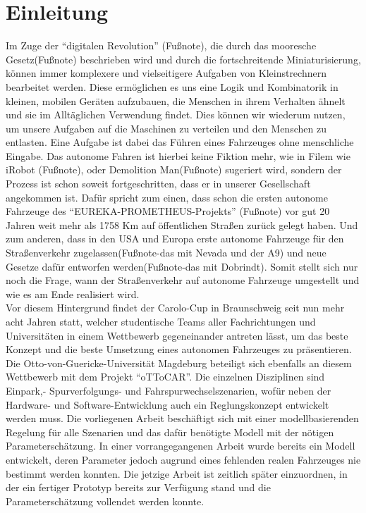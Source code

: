 \section{Einleitung}
Im Zuge der "`digitalen Revolution"' (Fußnote), die durch das mooresche Gesetz(Fußnote) beschrieben wird und durch die fortschreitende Miniaturisierung, können immer komplexere und vielseitigere Aufgaben von Kleinstrechnern bearbeitet werden. Diese ermöglichen es uns eine Logik und Kombinatorik in kleinen, mobilen Geräten aufzubauen, die Menschen in ihrem Verhalten ähnelt und sie im Alltäglichen Verwendung findet. Dies können wir wiederum nutzen, um unsere Aufgaben auf die Maschinen zu verteilen und den Menschen zu entlasten. Eine Aufgabe ist dabei das Führen eines Fahrzeuges ohne menschliche Eingabe. Das autonome Fahren ist hierbei keine Fiktion mehr, wie in Filem wie iRobot (Fußnote), oder Demolition Man(Fußnote) sugeriert wird, sondern der Prozess ist schon soweit fortgeschritten, dass er in unserer Gesellschaft angekommen ist. Dafür spricht zum einen, dass schon die ersten autonome Fahrzeuge des "`EUREKA-PROMETHEUS-Projekts"' (Fußnote) vor gut 20 Jahren weit mehr als 1758 Km auf öffentlichen Straßen zurück gelegt haben. Und zum anderen, dass in den USA und Europa erste autonome Fahrzeuge für den Straßenverkehr zugelassen(Fußnote-das mit Nevada und der A9) und neue Gesetze dafür entworfen werden(Fußnote-das mit Dobrindt). Somit stellt sich nur noch die Frage, wann der Straßenverkehr auf autonome Fahrzeuge umgestellt und wie es am Ende realisiert wird.\\

Vor diesem Hintergrund findet der Carolo-Cup in Braunschweig seit nun mehr acht Jahren statt, welcher studentische Teams aller Fachrichtungen und Universitäten in einem Wettbewerb gegeneinander antreten lässt, um das beste Konzept und die beste Umsetzung eines autonomen Fahrzeuges zu präsentieren. Die Otto-von-Guericke-Universität Magdeburg beteiligt sich ebenfalls an diesem Wettbewerb mit dem Projekt "`oTToCAR"'. Die einzelnen Disziplinen sind Einpark,- Spurverfolgungs- und Fahrspurwechselszenarien, wofür neben der Hardware- und Software-Entwicklung auch ein Reglungskonzept entwickelt werden muss. Die vorliegenen Arbeit beschäftigt sich mit einer modellbasierenden Regelung für alle Szenarien und das dafür benötigte Modell mit der nötigen Parameterschätzung. In einer vorrangegangenen Arbeit \cite{VikAnd} wurde bereits ein Modell entwickelt, deren Parameter jedoch augrund eines fehlenden realen Fahrzeuges nie bestimmt werden konnten. Die jetzige Arbeit ist zeitlich später einzuordnen, in der ein fertiger Prototyp bereits zur Verfügung stand und die Parameterschätzung vollendet werden konnte.
 